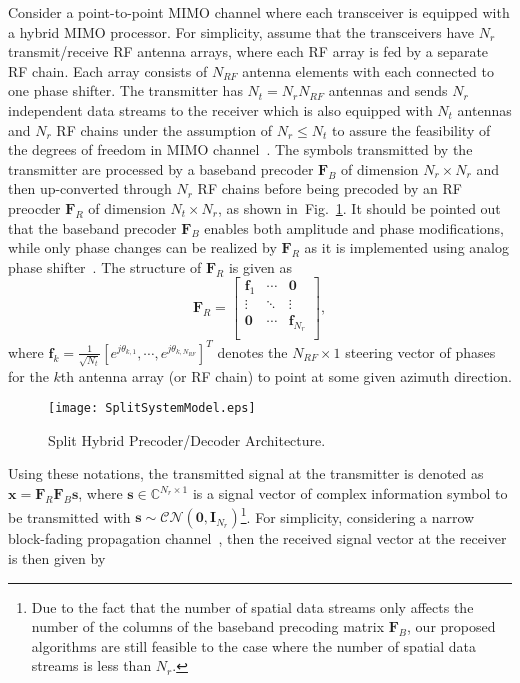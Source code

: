 \documentclass[11pt,draftcls,onecolumn]{IEEEtran}
\begin{document}
Consider a point-to-point MIMO channel where each transceiver is equipped with a hybrid MIMO processor.  For simplicity, assume that the transceivers have $N_{r}$ transmit/receive RF antenna arrays, where each RF array is fed by a separate RF chain. Each array consists of $N_{RF}$ antenna elements with each connected to one phase shifter. The transmitter has $N_{t}=N_{r}N_{RF}$ antennas and sends $N_{r}$ independent data streams to the receiver which is also equipped with $N_{t}$ antennas and $N_{r}$ RF chains under the assumption of $N_{r}\leq N_{t}$ to assure the feasibility of the degrees of freedom in MIMO channel~\cite{TITGou2010}. The symbols transmitted by the transmitter are processed by a baseband precoder $\bm{F}_{B}$ of dimension $N_{r}\times N_{r}$ and then up-converted through $N_{r}$ RF chains before being precoded by an RF preocder $\bm{F}_{R}$ of dimension $N_{t}\times N_{r}$, as shown in~Fig.~\ref{SplitSystemModel}. It should be pointed out that the baseband precoder $\bm{F}_{B}$ enables both amplitude and phase modifications, while only phase changes can be realized by $\bm{F}_{R}$ as it is implemented using analog phase shifter~\cite{BookFir2010}. The structure of $\bm{F}_{R}$ is given as
\begin{equation}\label{SplitBeam01}
\bm{F}_{R}=\begin{bmatrix}
\bm{f}_{1}&\cdots&\bm{0}\\
\vdots& \ddots&\vdots\\
\bm{0}& \cdots&\bm{f}_{N_{r}}\\
\end{bmatrix},
\end{equation}
where $\bm{f}_{k}=\frac{1}{\sqrt{N_{t}}}\left[e^{j\theta_{k,1}},\cdots,e^{j\theta_{k,N_{RF}}}\right]^{T}$ denotes the  $N_{RF}\times 1$ steering vector of phases for the $k$th antenna array (or RF chain) to point at some given azimuth direction.%
\begin{figure}[h]%
\centering
{}
\onelinecaptionstrue
\texttt{[image: SplitSystemModel.eps]}\\
\caption{Split Hybrid Precoder/Decoder Architecture.}
\label{SplitSystemModel}
\end{figure}
Using these notations, the transmitted signal at the transmitter is denoted as $\bm{x}=\bm{F}_{R}\bm{F}_{B}\bm{s}$, where $\bm{s}\in\mathbb{C}^{N_{r}\times 1}$ is a signal vector of complex information symbol to be transmitted with $\bm{s}\sim\mathcal{CN}\left(\bm{0},\bm{I}_{N_{r}}\right)$\footnote{Due to the fact that the number of spatial data streams only affects the number of the columns of the baseband precoding matrix $\bm{F}_{B}$, our proposed algorithms are still feasible to the case where the number of spatial data streams is less than $N_{r}$.}. For simplicity, considering a narrow block-fading propagation channel~\cite{TWCAyach2014,JSTSPAlk2014}, then the received signal vector at the receiver is then given by
\end{document}
